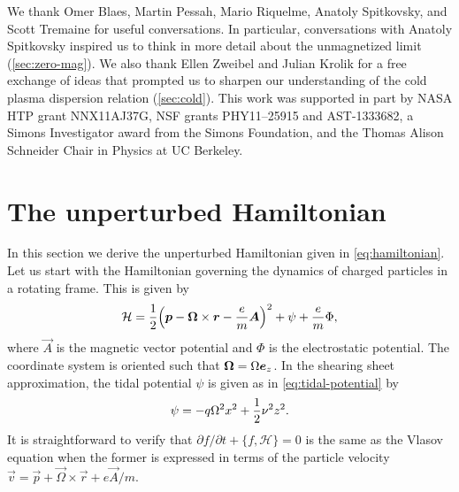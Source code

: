 \documentclass[aps,pre,notitlepage,amsmath,amssymb,amsfonts,nobibnotes,nofootinbib,superscriptaddress]{revtex4-1}
\begin{document}
\acknowledgments{}

We thank Omer Blaes, Martin Pessah, Mario Riquelme, Anatoly Spitkovsky, and
Scott Tremaine for useful conversations. In particular, conversations with
Anatoly Spitkovsky inspired us to think in more detail about the unmagnetized
limit (\cref{sec:zero-mag}). We also thank Ellen Zweibel and Julian Krolik for
a free exchange of ideas that prompted us to sharpen our understanding of the
cold plasma dispersion relation (\cref{sec:cold}). This work was supported in
part by NASA HTP grant NNX11AJ37G, NSF grants PHY11--25915 and AST-1333682, a
Simons Investigator award from the Simons Foundation, and the Thomas Alison
Schneider Chair in Physics at UC Berkeley.

\appendix
{}

\section{The unperturbed Hamiltonian}
\label{app:unperturbed-hamiltonian}

In this section we derive the unperturbed Hamiltonian given in
\cref{eq:hamiltonian}. Let us start with the Hamiltonian governing the
dynamics of charged particles in a rotating frame. This is given by
\begin{equation}
  \mathcal{H} = \frac{1}{2}{\left(
    \vec{p} - \vec{\Omega}\times\vec{r} - \cm\vec{A}
  \right)}^2 + \psi + \cm\Phi,
\end{equation}
where $\vec{A}$ is the magnetic vector potential and $\Phi$ is the
electrostatic potential. The coordinate system is oriented such that
$\bm{\Omega}=\Omega\bm{e}_z$. In the shearing sheet approximation, the tidal
potential $\psi$ is given as in \cref{eq:tidal-potential} by
\begin{equation}
  \psi = -q\Omega^2 x^2 + \frac{1}{2}\nu^2 z^2.
\end{equation}
It is straightforward to verify that
$\partial{}f/\partial{}t+\{f,\mathcal{H}\}=0$ is the same as the Vlasov
equation  when the former is expressed in terms of
the particle velocity $\vec{v}=\vec{p}+\vec{\Omega}\times\vec{r}+e\vec{A}/m$.
\end{document}
